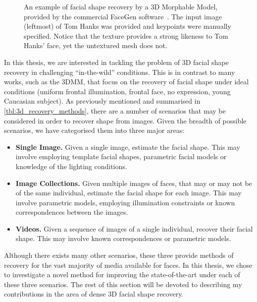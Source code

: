 \begin{figure}[t]
	\hspace*{\fill}
	\caption{An example of facial shape recovery by a 3D Morphable Model, 
	         provided by the commercial FaceGen software~\cite{facegen}. The
	         input image (leftmost) of Tom Hanks was provided and keypoints were
	         manually specified. Notice that the texture provides a strong 
	         likeness to Tom Hanks' face, yet the untextured mesh does not.}
\label{fig:facegen_tom_hanks}
\end{figure}

In this thesis, we are interested in tackling the problem of 3D facial shape
recovery in challenging ``in-the-wild'' conditions. This is in contrast
to many works, such as the 3DMM, that focus on the recovery of facial shape
under ideal conditions (uniform frontal illumination, frontal face,
no expression, young Caucasian subject). As previously mentioned and summarised
in \cref{tbl:3d_recovery_methods}, there are 
a number of scenarios that may be considered in order to recover shape from
images. Given the breadth of possible scenarios, we have categorised them into
three major areas:
\begin{itemize}
	\item \textbf{Single Image.} Given a single image, estimate the facial 
	      shape. This may involve employing template facial shapes, parametric
	      facial models or knowledge of the lighting conditions. 
	\item \textbf{Image Collections.} Given multiple images of faces, that may
	      or may not be of the same individual, estimate the facial shape for
	      each image. This may involve parametric models, employing illumination
	      constraints or known correspondences between the images.
	\item \textbf{Videos.} Given a sequence of images of a single individual,
	      recover their facial shape. This may involve known correspondences or
	      parametric models.
\end{itemize}
Although there exists many other scenarios, these three provide methods of
recovery for the vast majority of media available for faces. In this thesis, we
chose to investigate a novel method for improving the state-of-the-art under
each of these three scenarios. The rest of this section will be devoted to
describing my contributions in the area of dense 3D facial shape recovery.
